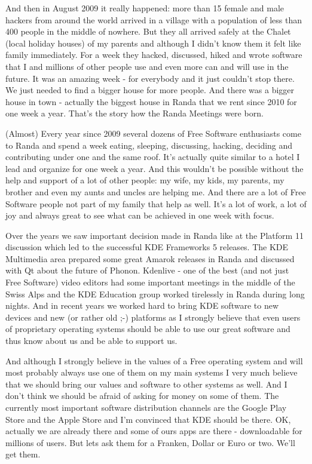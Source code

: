 And then in August 2009 it really happened: more than 15 female and male hackers from around the world arrived in a village with a population of less than 400 people in the middle of nowhere. But they all arrived safely at the Chalet (local holiday houses) of my parents and although I didn't know them it felt like family immediately. For a week they hacked, discussed, hiked and wrote software that I and millions of other people use and even more can and will use in the future. It was an amazing week - for everybody and it just couldn't stop there. We just needed to find a bigger house for more people. And there was a bigger house in town - actually the biggest house in Randa that we rent since 2010 for one week a year. That's the story how the Randa Meetings were born.

(Almost) Every year since 2009 several dozens of Free Software enthusiasts come to Randa and spend a week eating, sleeping, discussing, hacking, deciding and contributing under one and the same roof. It's actually quite similar to a hotel I lead and organize for one week a year. And this wouldn't be possible without the help and support of a lot of other people: my wife, my kids, my parents, my brother and even my aunts and uncles are helping me. And there are a lot of Free Software people not part of my family that help as well. It's a lot of work, a lot of joy and always great to see what can be achieved in one week with focus.

Over the years we saw important decision made in Randa like at the Platform 11 discussion which led to the successful KDE Frameworks 5 releases. The KDE Multimedia area prepared some great Amarok releases in Randa and discussed with Qt about the future of Phonon. Kdenlive - one of the best (and not just Free Software) video editors had some important meetings in the middle of the Swiss Alps and the KDE Education group worked tirelessly in Randa during long nights. And in recent years we worked hard to bring KDE software to new devices and new (or rather old ;-) platforms as I strongly believe that even users of proprietary operating systems should be able to use our great software and thus know about us and be able to support us.

And although I strongly believe in the values of a Free operating system and will most probably always use one of them on my main systems I very much believe that we should bring our values and software to other systems as well. And I don't think we should be afraid of asking for money on some of them. The currently most important software distribution channels are the Google Play Store and the Apple Store and I'm convinced that KDE should be there. OK, actually we are already there and some of ours apps are there - downloadable for millions of users. But lets ask them for a Franken, Dollar or Euro or two. We'll get them.

